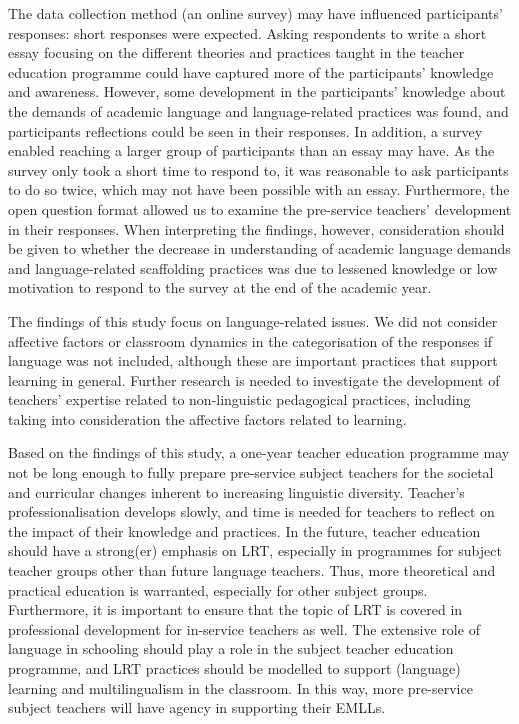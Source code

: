 \documentclass[output=paper]{langscibook}
\begin{document}
\begin{sloppypar}
The data collection method (an online survey) may have influenced participants’ responses: short responses were expected. Asking respondents to write a short essay focusing on the different theories and practices taught in the teacher education programme could have captured more of the participants’ knowledge and awareness. However, some development in the participants’ knowledge about the demands of academic language and language-related practices was found, and participants reflections could be seen in their responses. In addition, a survey enabled reaching a larger group of participants than an essay may have. As the survey only took a short time to respond to, it was reasonable to ask participants to do so twice, which may not have been possible with an essay. Furthermore, the open question format allowed us to examine the pre-service teachers’ development in their responses. When interpreting the findings, however, consideration should be given to whether the decrease in understanding of academic language demands and language-related scaffolding practices was due to lessened knowledge or low motivation to respond to the survey at the end of the academic year. 
\end{sloppypar}

The findings of this study focus on language-related issues. We did not consider affective factors or classroom dynamics in the categorisation of the responses if language was not included, although these are important practices that support learning in general. Further research is needed to investigate the development of teachers’ expertise related to non-linguistic pedagogical practices, including taking into consideration the affective factors related to learning.

Based on the findings of this study, a one-year teacher education programme may not be long enough to fully prepare pre-service subject teachers for the societal and curricular changes inherent to increasing linguistic diversity. Teacher’s professionalisation develops slowly, and time is needed for teachers to reflect on the impact of their knowledge and practices. In the future, teacher education should have a strong(er) emphasis on LRT, especially in programmes for subject teacher groups other than future language teachers. Thus, more theoretical and practical education is warranted, especially for other subject groups. Furthermore, it is important to ensure that the topic of LRT is covered in professional development for in-service teachers as well. The extensive role of language in schooling should play a role in the subject teacher education programme, and LRT practices should be modelled to support (language) learning and multilingualism in the classroom. In this way, more pre-service subject teachers will have agency in supporting their EMLLs.

\printbibliography[heading=subbibliography,notkeyword=this]
\end{document}
